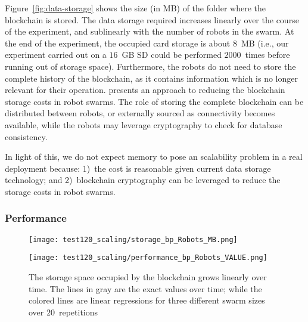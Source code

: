 \documentclass[runningheads]{llncs}
\begin{document}
Figure~\ref{fig:data-storage} shows the size (in MB) of the folder where the blockchain is stored. The data storage required increases linearly over the course of the experiment, and sublinearly with the number of robots in the swarm. At the end of the experiment, the occupied card storage is about $8$~MB (i.e., our experiment carried out on a $16$~GB SD could be performed $2000$~times before running out of storage space). Furthermore, the robots do not need to store the complete history of the blockchain, as it contains information which is no longer relevant for their operation. \cite{nishida_suppressing_2018} presents an approach to reducing the blockchain storage costs in robot swarms. The role of storing the complete blockchain can be distributed between robots, or externally sourced as connectivity becomes available, while the robots may leverage cryptography to check for database consistency.

In light of this, we do not expect memory to pose an scalability problem in a real deployment because: 1)~the cost is reasonable given current data storage technology; and 2)~blockchain cryptography can be leveraged to reduce the storage costs in robot swarms.




\subsubsection{Performance}



\begin{figure}
\centering
\begin{minipage}{.495\textwidth}
  \centering
  \texttt{[image: test120\_scaling/storage\_bp\_Robots\_MB.png]}
  \label{fig:data-storage}
\end{minipage}
\centering
\begin{minipage}{.495\textwidth}
  \centering
  \texttt{[image: test120\_scaling/performance\_bp\_Robots\_VALUE.png]}
  \label{fig:performance}
\end{minipage}
\caption{The storage space occupied by the blockchain grows linearly over time. The lines in gray are the exact values over time; while the colored lines are linear regressions for three different swarm sizes over $20$~repetitions} 
\end{figure}
\end{document}
